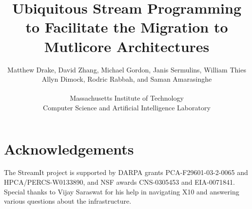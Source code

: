 \documentclass[times,11pt,twocolumn]{article}
\title{Ubiquitous Stream Programming to Facilitate the Migration to\\ Mutlicore Architectures}
\author{
  Matthew Drake, David Zhang, Michael Gordon, Janis Sermulins, William Thies\\
  Allyn Dimock, Rodric Rabbah, and Saman Amarasinghe\\
  \begin{twoaffiliations}
    Massachusetts Institute of Technology\\
    Computer Science and Artificial Intelligence Laboratory
  \end{twoaffiliations}
}
\begin{document}
  
  \maketitle
  \thispagestyle{empty}
  
  \begin{abstract}
    \vspace{-5.5pt}
    
  \end{abstract}
  
  
  
  
  
  
  \vspace{-2pt}
  \section*{Acknowledgements}
  \vspace{-7pt}
  The StreamIt
  project is supported by DARPA grants PCA-F29601-03-2-0065 and
  HPCA/PERCS-W0133890, and NSF awards CNS-0305453 and EIA-0071841.
  Special thanks to Vijay Saraswat for his help in navigating X10 and
  answering various questions about the infrastructure.


\end{document}
